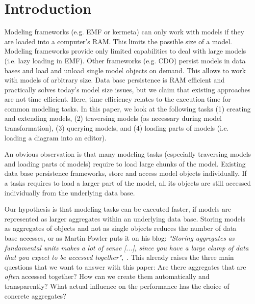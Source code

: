 \section{Introduction}

Modeling frameworks (e.g. EMF or kermeta) can only work with models if they are loaded into a computer's RAM. This limits the possible size of a model. 
Modeling frameworks provide only limited capabilities to deal with large models (i.e. lazy loading in EMF). 
Other frameworks (e.g. CDO) persist models in data bases and load and unload single model objects on demand. This allows to work with models of arbitrary size. 
Data base persistence is RAM efficient and practically solves today's model size issues, but we claim that existing approaches are not time efficient. 
Here, time efficiency relates to the execution time for common modeling tasks. In this paper, we look at the following tasks (1) creating and extending models, (2) traversing models (as necessary during model transformation), (3) querying models, and (4) loading parts of models (i.e. loading a diagram into an editor). 

An obvious observation is that many modeling tasks (especially traversing models and loading parts of models) require to load large chunks of the model. Existing data base persistence frameworks, store and access model objects individually. If a tasks requires to load a larger part of the model, all its objects are still accessed individually from the underlying data base.

Our hypothesis is that modeling tasks can be executed faster, if models are represented as larger aggregates within an underlying data base. Storing models as aggregates of objects and not as single objects reduces the number of data base accesses, or as Martin Fowler puts it on his blog: \emph{"Storing aggregates as fundamental units makes a lot of sense [...], since you have a large clump of data that you expect to be accessed together"},~\cite{}. This already raises the three main questions that we want to answer with this paper: Are there aggregates that are \emph{often} accessed together? How can we create them automatically and transparently? What actual influence on the performance has the choice of concrete aggregates?


